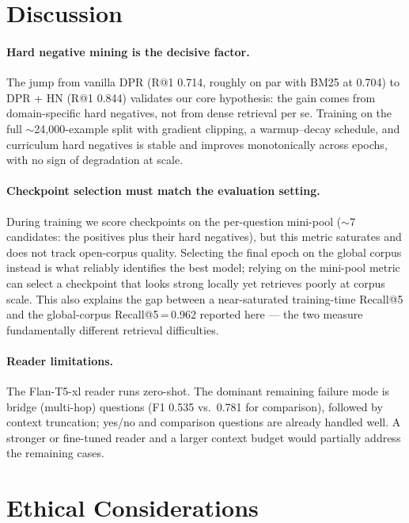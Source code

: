 \documentclass{llncs}
\begin{document}
\section{Discussion}

\paragraph{Hard negative mining is the decisive factor.}
The jump from vanilla DPR (R@1 0.714, roughly on par with BM25 at 0.704) to
DPR + HN (R@1 0.844) validates our core hypothesis: the gain comes from
domain-specific hard negatives, not from dense retrieval per se. Training on
the full $\sim$24{,}000-example split with gradient clipping, a warmup--decay
schedule, and curriculum hard negatives is stable and improves monotonically
across epochs, with no sign of degradation at scale.

\paragraph{Checkpoint selection must match the evaluation setting.}
During training we score checkpoints on the per-question mini-pool
($\sim$7 candidates: the positives plus their hard negatives), but this metric
saturates and does not track open-corpus quality. Selecting the final epoch on
the global corpus instead is what reliably identifies the best
model; relying on the mini-pool metric can select a checkpoint that looks
strong locally yet retrieves poorly at corpus scale. This also explains the
gap between a near-saturated training-time Recall@5 and the global-corpus
Recall@5\,=\,0.962 reported here --- the two measure fundamentally different
retrieval difficulties.

\paragraph{Reader limitations.}
The Flan-T5-xl reader runs zero-shot. The dominant remaining failure mode is
bridge (multi-hop) questions (F1 0.535 vs.\ 0.781 for comparison), followed by
context truncation; yes/no and comparison questions are already handled well.
A stronger or fine-tuned reader and a larger context budget would partially
address the remaining cases.

\section{Ethical Considerations}
\end{document}

